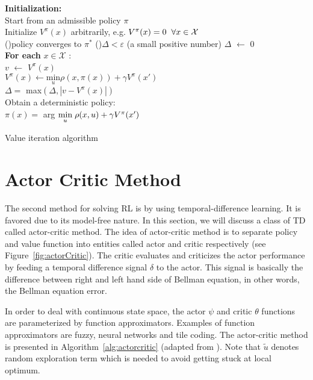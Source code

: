 \begin{algorithm}
	\textbf{Initialization:} \\
	Start from an admissible policy $ \pi $\\
	Initialize $V^{\pi}(x)$ arbitrarily, e.g. $ V^{\pi}(x) = 0 \hspace{2mm}  \forall x \in \mathcal{X} $ \\
	\Repeat(){policy converges to $ \pi^* $}{
		\Repeat(){$ \Delta  <  \varepsilon $ (a small positive number)}{
			$ \Delta $ $ \leftarrow $ 0 \\
			\textbf{For each} $ x \in \mathcal{X} $ :\\
			\hspace{5mm} $ v $ $ \leftarrow $ $ V^{\pi}(x) $ \\
			\hspace{5mm} $ V^{\pi}(x) \leftarrow \underset{u}{\text{min}} \rho(x, \pi(x)) + \gamma V^{\pi}(x') $ \\
			\hspace{5mm} $ \Delta = $ max$ (\Delta, |v-V^{\pi}(x)|) $ \\}
		\vspace{2mm}
		Obtain a deterministic policy: \\
		$ \pi(x)=$  arg $\underset{u}{\text{min}} \hspace{1mm} \rho(x, u) +\gamma V^{\pi}(x') $  \\

	}
	\caption{Value iteration algorithm}
\label{alg:VI}
\end{algorithm}

 
\section{Actor Critic Method} \label{sec:actor}
The second method for solving \acs{RL} is by using temporal-difference learning. It is favored due to its model-free nature. In this section, we will discuss a class of \ac{TD} called actor-critic method. The idea of actor-critic method is to separate policy and value function into entities called actor and critic respectively (see Figure~\ref{fig:actorCritic}). The critic evaluates and criticizes the actor performance by feeding a temporal difference signal $\delta$ to the actor. This signal is basically the difference between right and left hand side of Bellman equation, in other words, the Bellman equation error. 

In order to deal with continuous state space, the actor $\psi$ and critic $\theta$ functions are parameterized by function approximators. Examples of function approximators are fuzzy, neural networks and tile coding. The actor-critic method is presented in Algorithm~\ref{alg:actorcritic} (adapted from \cite{babuskaRL}). Note that $\tilde{u}$ denotes random exploration term which is needed to avoid getting stuck at local optimum.

